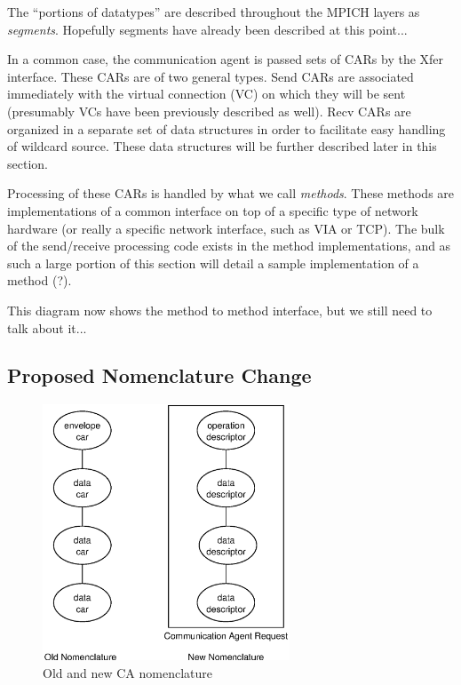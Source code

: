 \documentclass[11pt,letterpaper]{article}
\begin{document}
The ``portions of datatypes'' are described throughout the MPICH layers as
\emph{segments}.  Hopefully segments have already been described at this
point...


In a common case, the communication agent is passed sets of CARs by the Xfer
interface.  These CARs are of two general types.  Send CARs are associated
immediately with the virtual connection (VC) on which they will be sent
(presumably VCs have been previously described as well).  Recv CARs are
organized in a separate set of data structures in order to facilitate easy
handling of wildcard source.  These data structures will be further described
later in this section.

Processing of these CARs is handled by what we call \emph{methods}.  These
methods are implementations of a common interface on top of a specific type of
network hardware (or really a specific network interface, such as VIA or TCP).
The bulk of the send/receive processing code exists in the method
implementations, and as such a large portion of this section will detail a
sample implementation of a method (?).

This diagram now shows the method to method interface, but we still
need to talk about it...


\subsection{Proposed Nomenclature Change}

\begin{figure}
\begin{center}
\includegraphics[height=3in]{ca-nomenclature.eps}
\caption{\label{fig:ca-nomenclature} Old and new CA nomenclature}
\end{center}
\end{figure}
\end{document}
